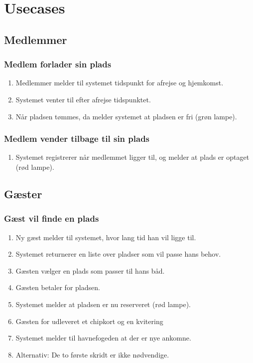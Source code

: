 \section{Usecases}

\subsection{Medlemmer}

    \subsubsection{Medlem forlader sin plads}

    \begin{enumerate}
      \item Medlemmer melder til systemet tidspunkt for afrejse og hjemkomst.
      \item Systemet venter til efter afrejse tidspunktet.
      \item Når pladsen tømmes, da melder systemet at pladsen er fri (grøn lampe).
    \end{enumerate}

        \subsubsection{Medlem vender tilbage til sin plads}

    \begin{enumerate}
      \item Systemet registrerer når medlemmet ligger til, og melder at plads er optaget (rød lampe).
    \end{enumerate}

\subsection{Gæster}


\subsubsection{Gæst vil finde en plads}

    \begin{enumerate}
      \item Ny gæst melder til systemet, hvor lang tid han vil ligge til.
      \item Systemet returnerer en liste over pladser som vil passe hans behov.
      \item Gæsten vælger en plads som passer til hans båd.
      \item Gæsten betaler for pladsen.
      \item Systemet melder at pladsen er nu reserveret (rød lampe).
      \item Gæsten for udleveret et chipkort og en kvitering
      \item Systemet melder til havnefogeden at der er nye ankomne.
      \item Alternativ: De to første skridt er ikke nødvendige.
    \end{enumerate}

